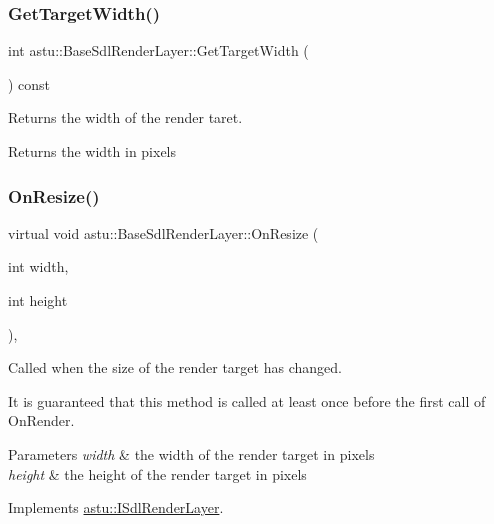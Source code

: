 \subsubsection{\texorpdfstring{Get\+Target\+Width()}{GetTargetWidth()}}
{\footnotesize\ttfamily int astu\+::\+Base\+Sdl\+Render\+Layer\+::\+Get\+Target\+Width (\begin{DoxyParamCaption}{ }\end{DoxyParamCaption}) const\hspace{0.3cm}{\ttfamily [inline]}}

Returns the width of the render taret.

\begin{DoxyReturn}{Returns}
the width in pixels 
\end{DoxyReturn}
\mbox{\label{classastu_1_1BaseSdlRenderLayer_a5b9f77db50819d6b29e0e8361d7fd91e}} 
\subsubsection{\texorpdfstring{On\+Resize()}{OnResize()}}
{\footnotesize\ttfamily virtual void astu\+::\+Base\+Sdl\+Render\+Layer\+::\+On\+Resize (\begin{DoxyParamCaption}\item[{int}]{width,  }\item[{int}]{height }\end{DoxyParamCaption})\hspace{0.3cm}{\ttfamily [override]}, {\ttfamily [virtual]}}

Called when the size of the render target has changed.

It is guaranteed that this method is called at least once before the first call of {\ttfamily On\+Render}.


\begin{DoxyParams}{Parameters}
{\em width} & the width of the render target in pixels \\
\hline
{\em height} & the height of the render target in pixels \\
\hline
\end{DoxyParams}


Implements \hyperlink{classastu_1_1ISdlRenderLayer_abcded808a2405e1e59413b5d1f981f13}{astu\+::\+I\+Sdl\+Render\+Layer}.

